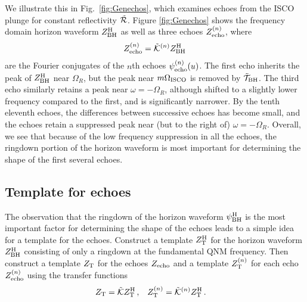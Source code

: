 \begin{refsection}
We illustrate this in Fig.~\ref{fig:Genechos}, which examines echoes from the ISCO plunge for constant reflectivity $\tilde{\mathcal R}$.
Figure \ref{fig:Genechos} shows the frequency domain horizon waveform $Z^{\rm H}_{\rm BH}$ as well as three echoes $Z_{\rm echo}^{(n)}$, where 
\begin{align}
\label{eq:nZecho}
Z_{\rm echo}^{(n)}=\tilde{\mathcal K}^{(n)}Z^{\rm H}_{\rm BH}
\end{align}
are the Fourier conjugates of the $n$th echoes $\psi_{\rm echo}^{(n)}(u)$.
The first echo inherits the peak of $Z^{\rm H}_{\rm BH}$ near $\Omega_R$, but the peak near $m\Omega_{\rm ISCO}$ is removed by $\tilde{\mathcal T}_{\rm BH}$.
The third echo similarly retains a peak near $\omega =-\Omega_R$, although shifted to a slightly lower frequency compared to the first, and is significantly narrower.
By the tenth eleventh echoes, the differences between successive echoes has become small, and the echoes retain a suppressed peak near (but to the right of) $\omega = - \Omega_R$. 
Overall, we see that because of the low frequency suppression in all the echoes, the ringdown portion of the horizon waveform is most important for determining the shape of the first several echoes.

\subsection{Template for echoes}

The observation that the ringdown of the horizon waveform $\psi^{\rm H}_{\rm BH}$ is the most important factor for determining the shape of the echoes leads to a simple idea for a template for the echoes. 
Construct a template  $Z_{\rm T}^{\rm H}$ for the horizon waveform $Z^{\rm H}_{\rm BH}$ consisting of only a ringdown at the fundamental QNM frequency. Then construct a template $Z_{\rm T}$  for the echoes  $Z_{\rm echo}$ and a template $Z_{\rm T}^{(n)}$ for each echo $Z_{\rm echo}^{(n)}$ using the transfer functions
\begin{align}
 &Z_{\rm T}=\tilde{\mathcal K} Z_{\rm T}^{\rm H}\,, &
 &Z_{\rm T}^{(n)}=\tilde{\mathcal K}^{(n)}Z_{\rm T}^{\rm H} \,.
\end{align}


\end{refsection}
